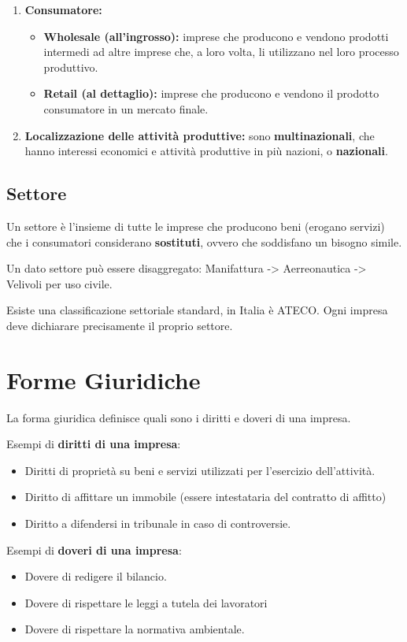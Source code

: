 \documentclass[../main.tex]{subfiles}
\begin{document}
\begin{enumerate}
\item \textbf{Consumatore:}
	\begin{itemize}
	\item
	\textbf{Wholesale (all'ingrosso):} imprese che producono e vendono prodotti intermedi ad altre imprese che, a loro volta, li utilizzano nel loro processo produttivo.
	\item \textbf{Retail (al dettaglio):} imprese che producono e vendono il prodotto consumatore in un mercato finale.
	\end{itemize}

\item \textbf{Localizzazione delle attività produttive:} sono \textbf{multinazionali}, che hanno interessi economici e attività produttive in più nazioni, o \textbf{nazionali}.

\end{enumerate}

\subsection{Settore}

Un settore è l'insieme di tutte le imprese che producono beni (erogano servizi) che i consumatori considerano \textbf{sostituti}, ovvero che soddisfano un bisogno simile.

Un dato settore può essere disaggregato: Manifattura -> Aerreonautica -> Velivoli per uso civile.

Esiste una classificazione settoriale standard, in Italia è ATECO. Ogni impresa deve dichiarare precisamente il proprio settore.


\section{Forme Giuridiche}

La forma giuridica definisce quali sono i diritti e doveri di una impresa.

Esempi di \textbf{diritti di una impresa}:
\begin{itemize}
\item
Diritti di proprietà su beni e servizi utilizzati per l'esercizio dell'attività.
\item Diritto di affittare un immobile (essere intestataria del contratto di affitto)
\item Diritto a difendersi in tribunale in caso di controversie.
\end{itemize}

Esempi di \textbf{doveri di una impresa}:
\begin{itemize}
\item Dovere di redigere il bilancio.
\item Dovere di rispettare le leggi a tutela dei lavoratori
\item Dovere di rispettare la normativa ambientale.
\end{itemize}
\end{document}
